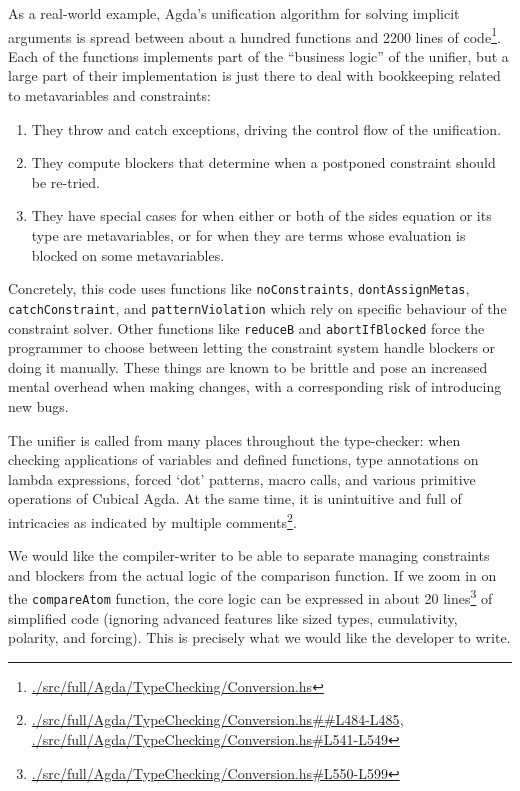 As a real-world example, Agda's unification algorithm for solving
implicit arguments is spread between about a hundred functions and 2200
lines of code\footnote{\href{https://github.com/agda/agda/blob/v2.6.4/src/full/Agda/TypeChecking/Conversion.hs}{./src/full/Agda/TypeChecking/Conversion.hs}}.
Each of the functions implements part of the ``business logic'' of the
unifier, but a large part of their implementation is just there to deal
with bookkeeping related to metavariables and constraints:

\begin{enumerate}
\def\labelenumi{\arabic{enumi}.}
\tightlist
\item
  They throw and catch exceptions, driving the control flow of the
  unification.
\item
  They compute blockers that determine when a postponed constraint
  should be re-tried.
\item
  They have special cases for when either or both of the sides equation
  or its type are metavariables, or for when they are terms whose
  evaluation is blocked on some metavariables.
\end{enumerate}

Concretely, this code uses functions like \texttt{noConstraints},
\texttt{dontAssignMetas}, \texttt{catchConstraint}, and
\texttt{patternViolation} which rely on specific behaviour of the
constraint solver. Other functions like \texttt{reduceB} and
\texttt{abortIfBlocked} force the programmer to choose between letting
the constraint system handle blockers or doing it manually. These things
are known to be brittle and pose an increased mental overhead when
making changes, with a corresponding risk of introducing new bugs.

The unifier is called from many places throughout the type-checker: when
checking applications of variables and defined functions, type
annotations on lambda expressions, forced `dot' patterns, macro calls,
and various primitive operations of Cubical Agda. At the same time, it
is unintuitive and full of intricacies as indicated by multiple
comments\footnote{\href{https://github.com/agda/agda/blob/v2.6.4/src/full/Agda/TypeChecking/Conversion.hs\#L484-L485}{./src/full/Agda/TypeChecking/Conversion.hs\#\#L484-L485},
  \href{https://github.com/agda/agda/blob/v2.6.4/src/full/Agda/TypeChecking/Conversion.hs\#L541-L549}{./src/full/Agda/TypeChecking/Conversion.hs\#L541-L549}}.

We would like the compiler-writer to be able to separate managing
constraints and blockers from the actual logic of the comparison
function. If we zoom in on the \texttt{compareAtom} function, the core
logic can be expressed in about 20 lines\footnote{\href{https://github.com/agda/agda/blob/v2.6.4/src/full/Agda/TypeChecking/Conversion.hs\#L550-L599}{./src/full/Agda/TypeChecking/Conversion.hs\#L550-L599}}
of simplified code (ignoring advanced features like sized types,
cumulativity, polarity, and forcing). This is precisely what we would
like the developer to write.

